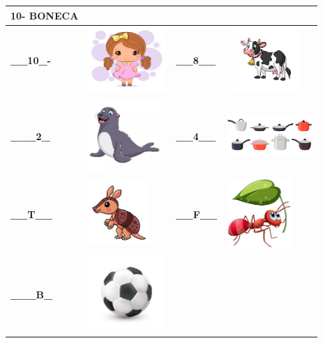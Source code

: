\begin{longtable}[]{@{}llll@{}}
\begin{minipage}[b]{0.24\columnwidth}
\textbf{10- BONECA}\strut
\end{minipage}\tabularnewline
\midrule
\endhead
\textbf{\_\_10\_-} &
\includegraphics[width=1.16667in,height=0.96319in]{media/image16.jpeg} &
\textbf{\_\_8\_\_} &
\includegraphics[width=1.16127in,height=0.95833in]{media/image17.jpeg}\tabularnewline
\textbf{\_\_\_2\_} &
\includegraphics[width=1.09375in,height=1.09375in]{media/image18.jpeg} &
\textbf{\_\_4\_\_} &
\includegraphics[width=1.27986in,height=0.98958in]{media/image19.jpeg}\tabularnewline
\textbf{\_\_T\_\_} &
\includegraphics[width=0.92708in,height=0.92708in]{media/image20.jpeg} &
\textbf{\_\_F\_\_} &
\includegraphics[width=0.97986in,height=1.05208in]{media/image21.jpeg}\tabularnewline
\textbf{\_\_\_B\_} &
\includegraphics[width=1.13542in,height=1.13542in]{media/image22.jpeg} &

\end{longtable}
